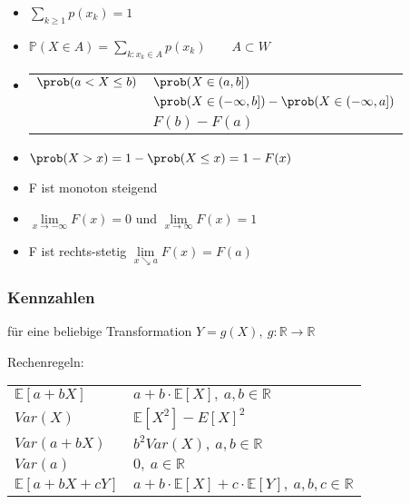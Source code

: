 \documentclass[8pt,a4paper]{scrartcl}
\begin{document}
\begin{multicols*}{3}
\begin{itemize}
\item $\sum\limits_{k\geq 1}p(x_k)=1$
\item $\mathbb{P}(X\in A)=\sum\limits_{k:x_k\in A}p(x_k)\qquad A\subset W$
\item \begin{tabular}{l@{ = }l}$\prob(a<X\leq b)$&$\prob(X\in(a,b])$\\
&$\prob(X\in(-\infty,b])-\prob(X\in(-\infty,a])$\\
&$F(b)-F(a)$
\end{tabular}
\item $\prob(X>x)=1-\prob(X\leq x)=1-F(x)$
\item F ist monoton steigend
\item $\lim\limits_{x\rightarrow -\infty}F(x)=0$ und $\lim\limits_{x\rightarrow \infty}F(x)=1$
\item F ist rechts-stetig \dahe $\lim\limits_{x\searrow a}F(x)=F(a)$
\end{itemize}



\subsubsection{Kennzahlen}


für eine beliebige Transformation $Y=g(X),\ g\!:\!\mathbb{R}\rightarrow\mathbb{R}$




Rechenregeln:

\begin{tabular}{l@{ = }l}
$\mathbb{E}[a+bX]$&$a+b\cdot \mathbb{E}[X],\ a,b\in\mathbb{R}$\\
$Var(X)$&$\mathbb{E}[X^2]-E[X]^2$\\
$Var(a+bX)$&$b^2Var(X),\ a,b\in\mathbb{R}$\\
$Var(a)$&$0,\ a\in\mathbb{R}$\\
$\mathbb{E}[a+bX+cY]$&$a+b\cdot\mathbb{E}[X]+c\cdot\mathbb{E}[Y],\ a,b,c\in\mathbb{R}$
\end{tabular}


\end{multicols*}
\end{document}
